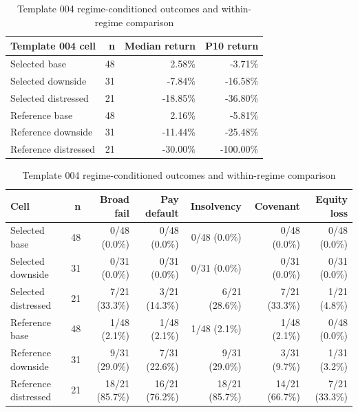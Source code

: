 \begin{table}[htbp]\centering\small
\caption{Template 004 regime-conditioned outcomes and within-regime comparison}\label{tab:A2}
\begin{tabular}{lrrr}
\toprule
Template 004 cell & n & Median return & P10 return \\
\midrule
Selected base & 48 & 2.58\% & -3.71\% \\
Selected downside & 31 & -7.84\% & -16.58\% \\
Selected distressed & 21 & -18.85\% & -36.80\% \\
Reference base & 48 & 2.16\% & -5.81\% \\
Reference downside & 31 & -11.44\% & -25.48\% \\
Reference distressed & 21 & -30.00\% & -100.00\% \\
\bottomrule
\end{tabular}
\medskip

{\scriptsize\setlength{\tabcolsep}{3pt}\begin{tabular}{lrrrrrr}
\toprule
Cell & n & Broad fail & Pay default & Insolvency & Covenant & Equity loss \\
\midrule
Selected base & 48 & 0/48 (0.0\%) & 0/48 (0.0\%) & 0/48 (0.0\%) & 0/48 (0.0\%) & 0/48 (0.0\%) \\
Selected downside & 31 & 0/31 (0.0\%) & 0/31 (0.0\%) & 0/31 (0.0\%) & 0/31 (0.0\%) & 0/31 (0.0\%) \\
Selected distressed & 21 & 7/21 (33.3\%) & 3/21 (14.3\%) & 6/21 (28.6\%) & 7/21 (33.3\%) & 1/21 (4.8\%) \\
Reference base & 48 & 1/48 (2.1\%) & 1/48 (2.1\%) & 1/48 (2.1\%) & 1/48 (2.1\%) & 0/48 (0.0\%) \\
Reference downside & 31 & 9/31 (29.0\%) & 7/31 (22.6\%) & 9/31 (29.0\%) & 3/31 (9.7\%) & 1/31 (3.2\%) \\
Reference distressed & 21 & 18/21 (85.7\%) & 16/21 (76.2\%) & 18/21 (85.7\%) & 14/21 (66.7\%) & 7/21 (33.3\%) \\
\bottomrule
\end{tabular}}
\medskip


\end{table}
